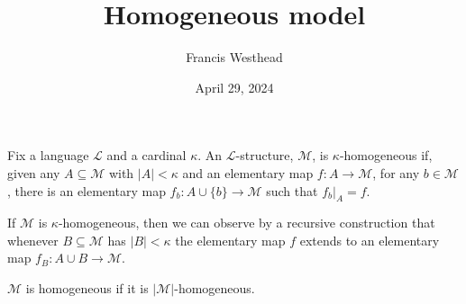 \documentclass[a4paper]{article}
\title{Homogeneous model}
\date{April 29, 2024}
\author{Francis Westhead}
\begin{document}
\maketitle
\par{Fix a language \(\mathcal {L}\) and a cardinal \(\kappa\). 
An \(\mathcal {L}\)-structure, \(\mathcal {M}\), is \(\kappa\)-homogeneous if, 
given any \(A  \subseteq   \mathcal {M}\) with \(|A| <  \kappa\) and an elementary map 
\(f:A  \rightarrow   \mathcal {M}\), for any \(b \in   \mathcal {M}\), there is an elementary map 
\(f_b: A  \cup   \{ b \}   \rightarrow   \mathcal {M}\) such that \(f_b|_A = f\).}\par{If \(\mathcal {M}\) is \(\kappa\)-homogeneous, then we can observe by a recursive construction 
that whenever \(B  \subseteq   \mathcal {M}\) has \(|B|< \kappa\) the elementary map \(f\)
extends to an elementary map \(f_B: A \cup  B  \rightarrow   \mathcal {M}\).}\par{\(\mathcal {M}\) is homogeneous if it is \(| \mathcal {M}|\)-homogeneous.}
\printbibliography
\end{document}
